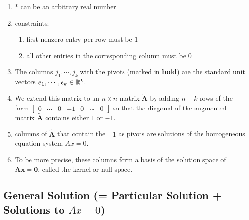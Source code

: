 \begin{enumerate}
    \item $*$ can be an arbitrary real number
    \hfill \cite{mfml/book/mml/Deisenroth-Faisal-Ong}

    \item constraints:
    \begin{enumerate}
        \item first nonzero entry per row must be $1$
        \hfill \cite{mfml/book/mml/Deisenroth-Faisal-Ong}

        \item all other entries in the corresponding column must be $0$
        \hfill \cite{mfml/book/mml/Deisenroth-Faisal-Ong}
    \end{enumerate}

    \item The columns $j_1, \cdots , j_k$ with the pivots (marked in \textbf{bold}) are the standard unit vectors $e_1, \cdots , e_k \in \mathbb{R}^k$.
    \hfill \cite{mfml/book/mml/Deisenroth-Faisal-Ong}

    \item We extend this matrix to an $n \times n$-matrix $\tilde{\bm{A}}$ by adding $n - k$ rows of the form
    $
        \begin{bmatrix}
            0 & \cdots & 0 & -1 & 0 & \cdots & 0
        \end{bmatrix}
    $
    so that the diagonal of the augmented matrix $\tilde{\bm{A}}$ contains either $1$ or $-1$.
    \hfill \cite{mfml/book/mml/Deisenroth-Faisal-Ong}

    \item columns of $\tilde{\bm{A}}$ that contain the $-1$ as pivots are solutions of the homogeneous equation system $Ax = 0$.
    \hfill \cite{mfml/book/mml/Deisenroth-Faisal-Ong}

    \item To be more precise, these columns form a basis of the solution space of $\bm{Ax} = \bm{0}$, called the kernel or null space.
    \hfill \cite{mfml/book/mml/Deisenroth-Faisal-Ong}
\end{enumerate}





\subsection{General Solution (= Particular Solution + Solutions to $Ax=0$)}

